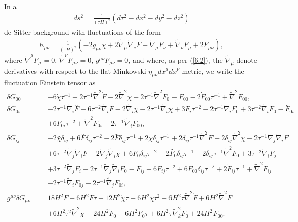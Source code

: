 \documentclass[aps,onecolumn,10pt]{revtex4}
\numberwithin{equation}{section}
\numberwithin{equation}{section}
\begin{document}
In a 
%
\begin{align}
ds^2=\frac{1}{(\tau H)^2}(d\tau^2-dx^2-dy^2-dz^2)
\label{6.50}
\end{align}
%
de Sitter background with fluctuations of the form 
%
\begin{align}
h_{\mu\nu}=\frac{1}{(\tau H)^2}(-2g_{\mu\nu}\chi+2\tilde{\nabla}_{\mu}\tilde{\nabla}_{\nu}F
+ \tilde{\nabla}_{\mu}F_{\nu}+\tilde{\nabla}_{\nu}F_{\mu}+2F_{\mu\nu}), 
\label{6.51}
\end{align}
%
where $\tilde{\nabla}^{\mu}F_{\mu}=0$, $\tilde{\nabla}^{\nu}F_{\mu\nu}=0$, $g^{\mu\nu}F_{\mu\nu}=0$, and where, as per (\ref{6.2}), the $\tilde{\nabla}_{\mu}$ denote derivatives with respect to the flat Minkowski $\eta_{\mu\nu}dx^{\mu}dx^{\nu}$ metric, we write the fluctuation Einstein tensor as 
%
\begin{eqnarray}
\delta G_{00}&=& -6 \dot{\chi} \tau^{-1} - 2 \tau^{-1} \tilde{\nabla}^2\dot{F} - 2 \tilde{\nabla}^2\chi -2 \tau^{-1} \tilde{\nabla}^2F_{0}- \overset{..}{F}_{00} - 2 \dot{F}_{00} \tau^{-1} + \tilde{\nabla}^2F_{00},
\nonumber\\ 
\delta G_{0i}&=& -2 \tau^{-1} \tilde{\nabla}_{i}\overset{..}{F} + 6 \tau^{-2} \tilde{\nabla}_{i}\dot{F} - 2 \tilde{\nabla}_{i}\dot{\chi} - 2 \tau^{-1} \tilde{\nabla}_{i}\chi +3 \dot{F}_{i} \tau^{-2} - 2 \tau^{-1} \tilde{\nabla}_{i}\dot{F}_{0} + 3 \tau^{-2} \tilde{\nabla}_{i}F_{0}- \overset{..}{F}_{0i}
 \nonumber \\ 
&& + 6 F_{0i} \tau^{-2} +  \tilde{\nabla}^2F_{0i} - 2 \tau^{-1} \tilde{\nabla}_{i}F_{00},
\nonumber\\ 
\delta G_{ij}&=& -2 \overset{..}{\chi}\delta_{ij} + 6 \overset{..}{F}\delta_{ij} \tau^{-2} - 2 \overset{...}{F}\delta_{ij} \tau^{-1} + 2 \dot{\chi}\delta_{ij} \tau^{-1} + 2\delta_{ij} \tau^{-1} \tilde{\nabla}^2\dot{F} + 2\delta_{ij} \tilde{\nabla}^2\chi - 2 \tau^{-1} \tilde{\nabla}_{j}\tilde{\nabla}_{i}\dot{F}
\nonumber \\ 
&& + 6 \tau^{-2} \tilde{\nabla}_{j}\tilde{\nabla}_{i}F - 2 \tilde{\nabla}_{j}\tilde{\nabla}_{i}\chi +6 \dot{F}_{0}\delta_{ij} \tau^{-2} - 2 \overset{..}{F}_{0}\delta_{ij} \tau^{-1} + 2\delta_{ij} \tau^{-1} \tilde{\nabla}^2F_{0} + 3 \tau^{-2} \tilde{\nabla}_{i}F_{j} 
\nonumber \\ 
&& + 3 \tau^{-2} \tilde{\nabla}_{j}F_{i} - 2 \tau^{-1} \tilde{\nabla}_{j}\tilde{\nabla}_{i}F_{0}- \overset{..}{F}_{ij} + 6 F_{ij} \tau^{-2} + 6 F_{00}\delta_{ij} \tau^{-2} +2 \dot{F}_{ij} \tau^{-1} +\tilde{\nabla}^2F_{ij}
 \nonumber \\ 
&& - 2 \tau^{-1} \tilde{\nabla}_{i}F_{0j} - 2 \tau^{-1} \tilde{\nabla}_{j}F_{0i},
\nonumber\\
g^{\mu\nu}\delta G_{\mu\nu} &=& 18 H^2 \overset{..}{F} - 6 H^2 \overset{...}{F} \tau + 12 H^2 \dot{\chi} \tau - 6 H^2 \overset{..}{\chi} \tau^2 + 6 H^2 \tau \tilde{\nabla}^2\dot{F} + 6 H^2 \tilde{\nabla}^2F 
\nonumber \\ 
&& + 6 H^2 \tau^2 \tilde{\nabla}^2\chi +24 H^2 \dot{F}_{0} - 6 H^2 \overset{..}{F}_{0} \tau + 6 H^2 \tau \tilde{\nabla}_{k}^2F_{0}+24 H^2 F_{00}.
\label{6.52}
\end{eqnarray}
\end{document}
